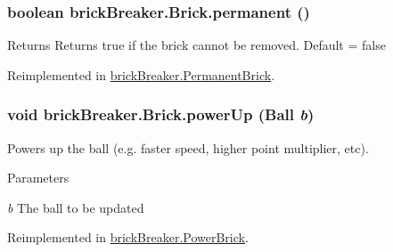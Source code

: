 \hypertarget{classbrick_breaker_1_1_brick_a5fa03da94163b3dc3707c030e85a1405}{
\subsubsection[{permanent}]{\setlength{\rightskip}{0pt plus 5cm}boolean brickBreaker.Brick.permanent ()}}
\label{classbrick_breaker_1_1_brick_a5fa03da94163b3dc3707c030e85a1405}
\begin{DoxyReturn}{Returns}
Returns true if the brick cannot be removed. Default = false 
\end{DoxyReturn}


Reimplemented in \hyperlink{classbrick_breaker_1_1_permanent_brick_a5095518bc2226f3257202d99e37d8ae4}{brickBreaker.PermanentBrick}.

\hypertarget{classbrick_breaker_1_1_brick_a109d6d8023e528284c1726ee55c3e50e}{
\subsubsection[{powerUp}]{\setlength{\rightskip}{0pt plus 5cm}void brickBreaker.Brick.powerUp ({\bf Ball} {\em b})}}
\label{classbrick_breaker_1_1_brick_a109d6d8023e528284c1726ee55c3e50e}
Powers up the ball (e.g. faster speed, higher point multiplier, etc). 
\begin{DoxyParams}{Parameters}
\item[{\em b}]The ball to be updated \end{DoxyParams}


Reimplemented in \hyperlink{classbrick_breaker_1_1_power_brick_aa5f41bb48fc63ed441ec2e9892ccdac3}{brickBreaker.PowerBrick}.

